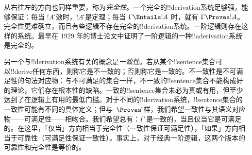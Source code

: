\documentclass[../../../include/open-logic-section]{subfiles}
\begin{document}
从右往左的方向也同样重要，称为\emph{完全性}。一个完全的!!{derivation}系统足够强，能够保证：每当 $!A$\~有效时，$!A$\~就是定理；每当 $\Gamma \Entails !A$ 时，就有 $\Gamma \Proves !A$。完全性更难确立，而且有些逻辑不存在完全的!!{derivation}系统。一阶逻辑则存在这样的系统。最早在 1929 年的博士论文中证明了一阶逻辑的一种!!a{derivation}系统是完全的。

另一个与!!{derivation}系统有关的概念是\emph{一致性}。若从某个!!{sentence}集合可以!!{derive}任何东西，则称它是不一致的；否则称它是一致的。不一致性是不可满足性的句法对应物：与不可满足的集合一样，不一致的!!{sentence}集合不能构成好的理论，它们存在根本性的缺陷。一致的!!{sentence}集合未必为真或有用，但至少达到了在逻辑上有用的最低门槛。对于不同的!!{derivation}系统，!!{sentence}集合的一致性可能有不同的具体定义；但与~$\Proves$\~一样，我们希望一致性与其语义对应物——可满足性——相吻合。我们希望总有：$\Gamma$ 是一致的，当且仅当它是可满足的。在这里，「仅当」方向相当于完全性（一致性保证可满足性），「如果」方向相当于可靠性（可满足性保证一致性）。事实上，对于经典一阶逻辑，这两个版本的可靠性和完全性是等价的。
\end{document}
